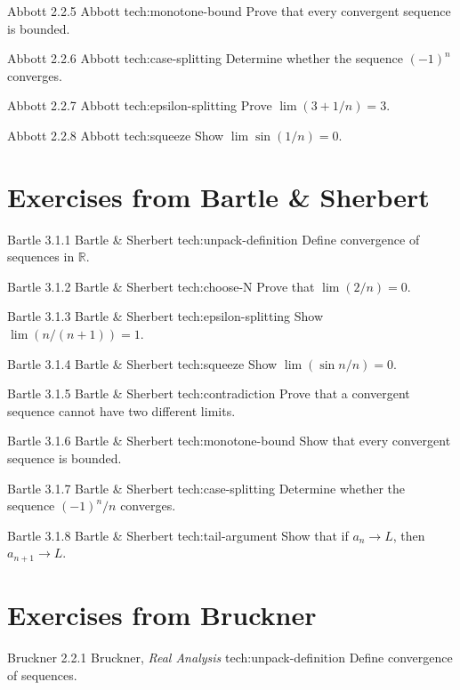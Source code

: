 \seqex
{Abbott 2.2.5}
{Abbott}
{tech:monotone-bound}
{Prove that every convergent sequence is bounded.}

\seqex
{Abbott 2.2.6}
{Abbott}
{tech:case-splitting}
{Determine whether the sequence $(-1)^n$ converges.}

\seqex
{Abbott 2.2.7}
{Abbott}
{tech:epsilon-splitting}
{Prove $\lim (3+1/n)=3$.}

\seqex
{Abbott 2.2.8}
{Abbott}
{tech:squeeze}
{Show $\lim \sin(1/n)=0$.}


\section*{Exercises from Bartle \& Sherbert}

\seqex
{Bartle 3.1.1}
{Bartle \& Sherbert}
{tech:unpack-definition}
{Define convergence of sequences in $\mathbb{R}$.}

\seqex
{Bartle 3.1.2}
{Bartle \& Sherbert}
{tech:choose-N}
{Prove that $\lim (2/n)=0$.}

\seqex
{Bartle 3.1.3}
{Bartle \& Sherbert}
{tech:epsilon-splitting}
{Show $\lim (n/(n+1))=1$.}

\seqex
{Bartle 3.1.4}
{Bartle \& Sherbert}
{tech:squeeze}
{Show $\lim (\sin n / n)=0$.}

\seqex
{Bartle 3.1.5}
{Bartle \& Sherbert}
{tech:contradiction}
{Prove that a convergent sequence cannot have two different limits.}

\seqex
{Bartle 3.1.6}
{Bartle \& Sherbert}
{tech:monotone-bound}
{Show that every convergent sequence is bounded.}

\seqex
{Bartle 3.1.7}
{Bartle \& Sherbert}
{tech:case-splitting}
{Determine whether the sequence $(-1)^n/n$ converges.}

\seqex
{Bartle 3.1.8}
{Bartle \& Sherbert}
{tech:tail-argument}
{Show that if $a_n\to L$, then $a_{n+1}\to L$.}


\section*{Exercises from Bruckner}

\seqex
{Bruckner 2.2.1}
{Bruckner, \textit{Real Analysis}}
{tech:unpack-definition}
{Define convergence of sequences.}

